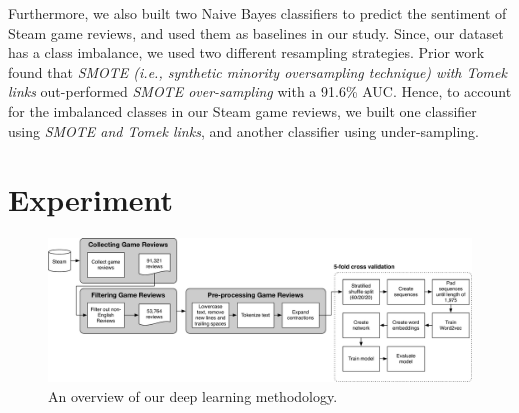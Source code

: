 \documentclass[conference]{IEEEtran}
\begin{document}
Furthermore, we also built two Naive Bayes classifiers to predict the sentiment of Steam game reviews, and used them as baselines in our study. Since, our dataset has a class imbalance, we used two different resampling strategies. Prior work~\cite{batista2003balancing} found that \textit{SMOTE (i.e., synthetic minority oversampling technique) with Tomek links} out-performed \textit{SMOTE over-sampling} with a 91.6\% AUC. Hence, to account for the imbalanced classes in our Steam game reviews, we built one classifier using \textit{SMOTE and Tomek links}, and another classifier using under-sampling.




\section{Experiment}
\label{sec:exp}

\begin{figure}[!t]
\center
    \includegraphics[width=1\textwidth]{img/methodology/dl_method.pdf}
  \caption{An overview of our deep learning methodology.}
  \label{fig:dl_method}
\end{figure}
\end{document}
